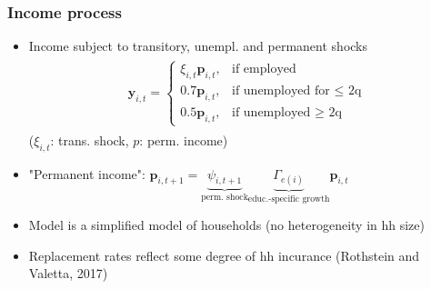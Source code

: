 \documentclass[pdflatex,aspectratio=169, handout]{beamer}
\begin{document}
    \begin{frame}
      \frametitle{ Income process}

      \begin{itemize}[<+->]

      \item Income subject to transitory, unempl. and permanent shocks
        \begin{equation}\begin{gathered}\begin{aligned}
          \mathbf{y}_{i,t} =   \begin{cases}
            \xi_{i,t}\mathbf{p}_{i,t}, & \text{if employed} \\
            0.7 \mathbf{p}_{i,t}, & \text{if unemployed for $\leq$ 2q} \\
            0.5 \mathbf{p}_{i,t}, & \text{if unemployed $\ge$ 2q} 
          \end{cases}
        \end{aligned}\end{gathered}\end{equation}
        ($\xi_{i,t}$: trans.
shock, $p$: perm.
income)
        
      \item "Permanent income":  $\mathbf{p}_{i,t+1} = \underbrace{\psi_{i,t+1}}_{\text{perm.
shock}} \underbrace{\Gamma_{e(i)}}_{\text{educ.-specific growth}}\mathbf{p}_{i,t}$ 


        \pause
        \bigskip
%        

	\item Model is a simplified model of households (no heterogeneity in hh size)
	\item Replacement rates reflect some degree of hh incurance (Rothstein and Valetta, 2017)       
        
      \end{itemize}

    \end{frame}
\end{document}
